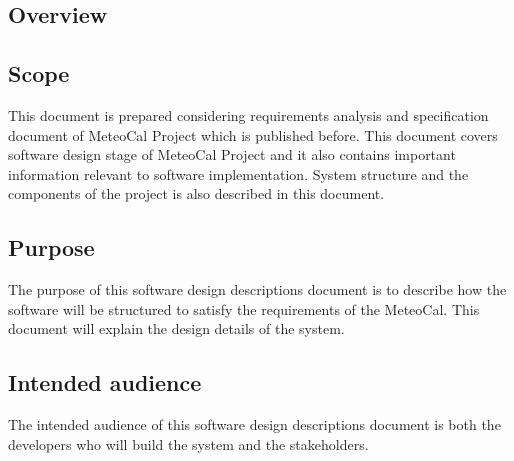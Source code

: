 \newpage

\begin{center}
\section{Overview}
\end{center}

\subsection{Scope}
\qquad This document is prepared considering requirements analysis and specification document of MeteoCal Project which is published before. This document covers software design stage of MeteoCal Project and it also contains important information relevant to software implementation. System structure and the components of the project is also described in this document.

\subsection{Purpose}
\qquad The purpose of this software design descriptions document is to describe how the software will be structured to satisfy the requirements of the MeteoCal. This document will explain the design details of the system.

\subsection{Intended audience} 
\qquad The intended audience of this software design descriptions document is both the developers who will build the system and the stakeholders. 